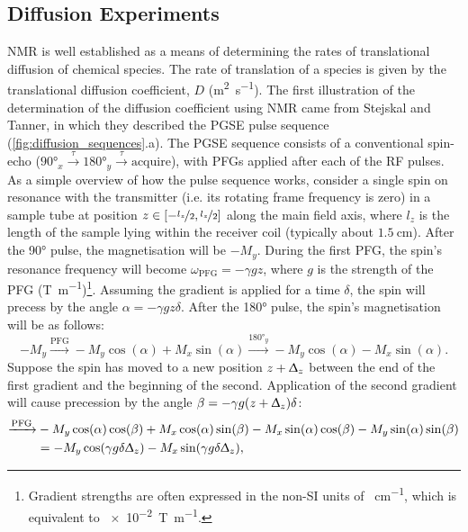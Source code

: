 \subsection{Diffusion Experiments}
\label{subsec:diffusion_experiments}
\ac{NMR} is well established as a means of determining the rates of
translational diffusion of chemical species\cite{Johnson1999,Morris2009b}.
The rate of translation of a species is given by the translational
diffusion coefficient, $D$ (\unit{\meter\squared\per\second})\cite[Chapter
19]{Atkins2014}.
The first illustration of the determination of the diffusion coefficient using
\ac{NMR} came from Stejskal and Tanner, in which they described the \ac{PGSE}
pulse sequence\cite{Stejskal1965} (\cref{fig:diffusion_sequences}.a).
The \ac{PGSE} sequence consists of a conventional spin-echo ($\ang{90}_x
\xrightarrow{\tau} \ang{180}_y \xrightarrow{\tau} \text{acquire}$), with
\acp{PFG} applied after each of the \ac{RF} pulses.
As a simple overview of how the pulse sequence works, consider a single spin on
resonance with the transmitter (i.e. its rotating frame frequency is zero) in a
sample tube at position $z \in [-\nicefrac{l_z}{2}, \nicefrac{l_z}{2}]$ along
the main field axis, where $l_z$ is the length of the sample lying within the
receiver coil (typically about $\qty{1.5}{\centi\meter}$).
After the \ang{90} pulse, the magnetisation will be $-M_y$.
During the first \ac{PFG}, the spin's resonance frequency will become
$\omega_{\text{PFG}} = -\gamma g z$, where $g$ is the strength of the \ac{PFG}
(\unit{\tesla\per\meter})\footnote{
    Gradient strengths are often expressed in the non-\ac{SI} units of
    \unit{\gauss\per\centi\meter}, which is equivalent to
    \qty[print-unity-mantissa = false]{e-2}{\tesla\per\meter}.
}.
Assuming the gradient is applied for a time $\delta$, the spin will
precess by the angle $\alpha = -\gamma g z \delta$. After the \ang{180}
pulse, the spin's magnetisation will be as follows:
\[
    -M_y
    \xrightarrow{\text{PFG}} -M_y \cos(\alpha) + M_x \sin(\alpha)
    \xrightarrow{\ang{180}_y} -M_y \cos(\alpha) - M_x \sin(\alpha).
\]
Suppose the spin has moved to a new position $z + \Updelta_z$
between the end of the first gradient and the beginning of the second.
Application of the second gradient will cause precession by the angle
$\beta = -\gamma g (z + \Updelta_z) \delta$:
\begin{equation*}
   \begin{split}
        \xrightarrow{\text{PFG}}
            &-M_y \cos(\alpha)\cos(\beta) +
            M_x \cos(\alpha)\sin(\beta) -
            M_x \sin(\alpha)\cos(\beta) -
            M_y \sin(\alpha)\sin(\beta)\\
        &= -M_y \cos(\gamma g \delta \Updelta_z) -
           M_x \sin(\gamma g \delta \Updelta_z),
   \end{split}
\end{equation*}
